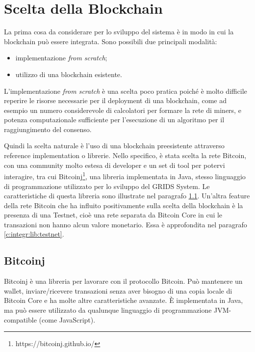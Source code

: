 \section{Scelta della Blockchain}
\label{c:integr:lib}

La prima cosa da considerare per lo sviluppo del sistema è in modo in cui la blockchain può essere integrata. Sono possibili due principali modalità:
\begin{itemize}
    \item implementazione \textit{from scratch};
    \item utilizzo di una blockchain esistente.
\end{itemize}

L'implementazione \textit{from scratch} è una scelta poco pratica poiché è molto difficile reperire le risorse necessarie per il deployment di una blockchain, come ad esempio un numero considerevole di calcolatori per formare la rete di miners, e potenza computazionale sufficiente per l'esecuzione di un algoritmo per il raggiungimento del consenso.

Quindi la scelta naturale è l'uso di una blockchain preesistente attraverso reference implementation o librerie. Nello specifico, è stata scelta la rete Bitcoin, con una community molto estesa di developer e un set di tool per potervi interagire, tra cui Bitcoinj\footnote{https://bitcoinj.github.io/}, una libreria implementata in Java, stesso linguaggio di programmazione utilizzato per lo sviluppo del GRIDS System. Le caratteristiche di questa libreria sono illustrate nel paragrafo \ref{c:integr:lib:bitcoinj}.
Un'altra feature della rete Bitcoin che ha influito positivamente sulla scelta della blockchain è la presenza di una Testnet, cioè una rete separata da Bitcoin Core in cui le transazioni non hanno alcun valore monetario. Essa è approfondita nel paragrafo \ref{c:integr:lib:testnet}.


\subsection{Bitcoinj}
\label{c:integr:lib:bitcoinj}

Bitcoinj è una libreria per lavorare con il protocollo Bitcoin. Può mantenere un wallet, inviare/ricevere transazioni senza aver bisogno di una copia locale di Bitcoin Core e ha molte altre caratteristiche avanzate. È implementata in Java, ma può essere utilizzato da qualunque linguaggio di programmazione JVM-compatible (come JavaScript).

